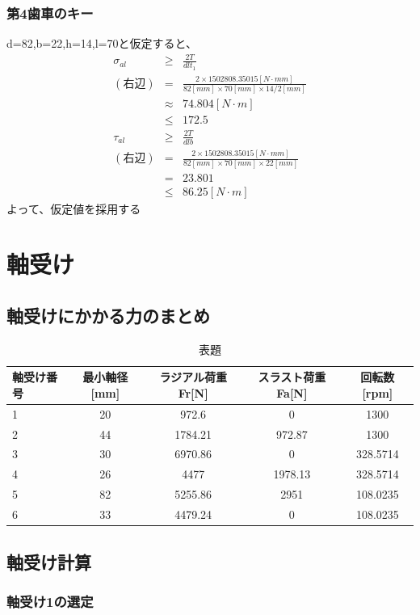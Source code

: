 \documentclass[a4j,twoside,openright,11pt]{jreport}
\begin{document}
\subsection{第4歯車のキー}
d=82,b=22,h=14,l=70と仮定すると、
\begin{eqnarray}
\sigma_{al} &\geq& \frac{2T}{dlt_1}\\
(右辺) &=& \frac{2 \times 1502808.35015[N \cdot mm]}{82[mm] \times 70[mm] \times 14/2[mm]}\\
       &\approx&74.804[N \cdot m]\\
       &\leq& 172.5\\
\tau_{al} &\geq& \frac{2T}{dlb}\\
(右辺) &=& \frac{2 \times 1502808.35015[N \cdot mm]}{82[mm] \times 70[mm] \times 22[mm]}\\
       &=& 23.801\\
       &\leq&86.25[N \cdot m]
\end{eqnarray}
よって、仮定値を採用する

\chapter{軸受け}
\section{軸受けにかかる力のまとめ}
\begin{table}[htb]
\begin{center}
  \caption{表題}
  \begin{tabular}{|l||c|c|c|c|} \hline
軸受け番号& 最小軸径[mm] &ラジアル荷重Fr[N] &スラスト荷重Fa[N]&回転数[rpm]\\\hline
1&20&972.6&0&1300\\
2&44&1784.21&972.87&1300\\
3&30&6970.86&0&328.5714\\
4&26&4477&1978.13&328.5714\\
5&82&5255.86&2951&108.0235\\
6&33&4479.24&0&108.0235\\
\hline
  \end{tabular}
\end{center}
\end{table}

\section{軸受け計算}
\newpage
\subsection{軸受け1の選定}
\end{document}
